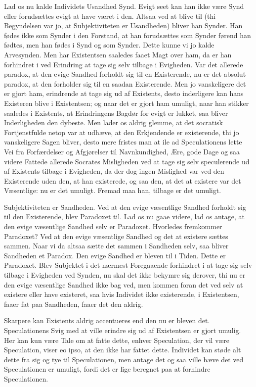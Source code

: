 \documentclass[12pt,a4paper]{article}
\begin{document}
Lad os nu kalde Individets Usandhed Synd. Evigt seet kan han ikke være Synd eller forudsættes evigt at have været i den. Altsaa ved at blive til (thi Begyndelsen var jo, at Subjektiviteten er Usandheden) bliver han Synder. Han fødes ikke som Synder i den Forstand, at han forudsættes som Synder førend han fødtes, men han fødes i Synd og som Synder. Dette kunne vi jo kalde Arvesynden. Men har Existentsen saaledes faaet Magt over ham, da er han forhindret i ved Erindring at tage sig selv tilbage i Evigheden. Var det allerede paradox, at den evige Sandhed forholdt sig til en Existerende, nu er det absolut paradox, at den forholder sig til en saadan Existerende. Men jo vanskeligere det er gjort ham, erindrende at tage sig ud af Existents, desto inderligere kan hans Existeren blive i Existentsen; og naar det er gjort ham umuligt, naar han stikker saaledes i Existents, at Erindringens Bagdør for evigt er lukket, saa bliver Inderligheden den dybeste. Men lader os aldrig glemme, at det socratisk Fortjenstfulde netop var at udhæve, at den Erkjendende er existerende, thi jo vanskeligere Sagen bliver, desto mere fristes man at ile ad Speculationens lette Vei fra Forfærdelser og Afgjørelser til Navnkundighed, Ære, gode Dage og saa videre Fattede allerede Socrates Misligheden ved at tage sig selv speculerende ud af Existents tilbage i Evigheden, da der dog ingen Mislighed var ved den Existerende uden den, at han existerede, og saa den, at det at existere var det Væsentlige: nu er det umuligt. Fremad maa han, tilbage er det umuligt.

Subjektiviteten er Sandheden. Ved at den evige væsentlige Sandhed forholdt sig til den Existerende, blev Paradoxet til. Lad os nu gaae videre, lad os antage, at den evige væsentlige Sandhed selv er Paradoxet. Hvorledes fremkommer Paradoxet? Ved at den evige væsentlige Sandhed og det at existere sættes sammen. Naar vi da altsaa sætte det sammen i Sandheden selv, saa bliver Sandheden et Paradox. Den evige Sandhed er bleven til i Tiden. Dette er Paradoxet. Blev Subjektet i det nærmest Foregaaende forhindret i at tage sig selv tilbage i Evigheden ved Synden, nu skal det ikke bekymre sig derover, thi nu er den evige væsentlige Sandhed ikke bag ved, men kommen foran det ved selv at existere eller have existeret, saa hvis Individet ikke existerende, i Existentsen, faaer fat paa Sandheden, faaer det den aldrig.

Skarpere kan Existents aldrig accentueres end den nu er bleven det. Speculationens Svig med at ville erindre sig ud af Existentsen er gjort umulig. Her kan kun være Tale om at fatte dette, enhver Speculation, der vil være Speculation, viser eo ipso, at den ikke har fattet dette. Individet kan støde alt dette fra sig og tye til Speculationen, men antage det og saa ville hæve det ved Speculationen er umuligt, fordi det er lige beregnet paa at forhindre Speculationen.
\end{document}
